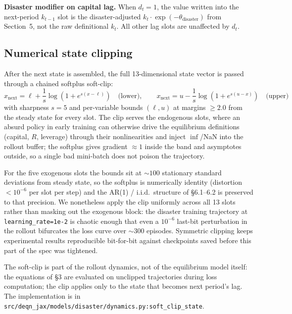 \documentclass[11pt]{article}
\begin{document}
\noindent\textbf{Disaster modifier on capital lag.}\;
When $d_t = 1$, the value written into the next-period $k_{t-1}$ slot is
the disaster-adjusted $k_t \cdot \exp(-\theta_{\text{disaster}})$ from
Section~5, not the raw definitional $k_t$. All other lag slots are
unaffected by $d_t$.

\subsection{Numerical state clipping}

After the next state is assembled, the full 13-dimensional state vector
is passed through a chained softplus soft-clip:
\begin{equation*}
  x_{\text{next}} = \ell + \frac{1}{s}\log(1+e^{s(x-\ell)})
  \quad\text{(lower)},\qquad
  x_{\text{next}} = u - \frac{1}{s}\log(1+e^{s(u-x)})
  \quad\text{(upper)}
\end{equation*}
with sharpness $s=5$ and per-variable bounds $(\ell, u)$ at margins
$\geq 2.0$ from the steady state for every slot. The clip serves the
endogenous slots, where an absurd policy in early training can otherwise
drive the equilibrium definitions (capital, $R$, leverage) through their
nonlinearities and inject $\inf$/NaN into the rollout buffer; the
softplus gives gradient $\approx 1$ inside the band and asymptotes
outside, so a single bad mini-batch does not poison the trajectory.

For the five exogenous slots the bounds sit at ${\sim}100$ stationary
standard deviations from steady state, so the softplus is numerically
identity (distortion ${<}10^{-6}$ per slot per step) and the AR(1) /
i.i.d.\ structure of \S6.1--6.2 is preserved to that precision. We
nonetheless apply the clip uniformly across all 13 slots rather than
masking out the exogenous block: the disaster training trajectory at
\texttt{learning\_rate=1e-2} is chaotic enough that even a $10^{-6}$
last-bit perturbation in the rollout bifurcates the loss curve over
${\sim}300$ episodes. Symmetric clipping keeps experimental results
reproducible bit-for-bit against checkpoints saved before this part of
the spec was tightened.

The soft-clip is part of the rollout dynamics, not of the equilibrium
model itself: the equations of \S3 are evaluated on unclipped
trajectories during loss computation; the clip applies only to the
state that becomes next period's lag. The implementation is in
\texttt{src/deqn\_jax/models/disaster/dynamics.py:soft\_clip\_state}.
\end{document}
